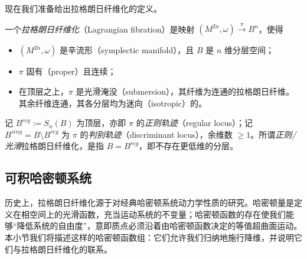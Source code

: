 现在我们准备给出拉格朗日纤维化的定义。

\begin{definition*}
一个\emph{拉格朗日纤维化}（Lagrangian fibration）是映射 $(M^{2n},\omega)\xrightarrow{\pi} B^n$，使得

\begin{itemize}[leftmargin=1.4em,itemsep=1pt,topsep=2pt]
  \item $(M^{2n},\omega)$ 是辛流形（symplectic manifold），且 $B$ 是 $n$ 维分层空间；
  \item $\pi$ 固有（proper）且连续；
  \item 在顶层之上，$\pi$ 是光滑淹没（submersion），其纤维为连通的拉格朗日纤维。其余纤维连通，其各分层均为迷向（isotropic）的。
\end{itemize}

记 $B^{reg}:=S_n (B)$ 为顶层，亦即 $\pi$ 的\emph{正则轨迹}（regular locus）；记 $B^{sing}=B\setminus B^{reg}$ 为 $\pi$ 的\emph{判别轨迹}（discriminant locus），余维数 $\geq 1$。所谓\emph{正则/光滑}拉格朗日纤维化，是指 $B=B^{reg}$，即不存在更低维的分层。
\end{definition*}

\subsection{可积哈密顿系统}

历史上，拉格朗日纤维化源于对经典哈密顿系统动力学性质的研究。哈密顿量是定义在相空间上的光滑函数，充当运动系统的不变量；哈密顿函数的存在使我们能够“降低系统的自由度”，意即质点必须沿着由哈密顿函数决定的等值超曲面运动。本小节我们将描述这样的哈密顿函数组：它们允许我们归纳地施行降维，并说明它们与拉格朗日纤维化的联系。


